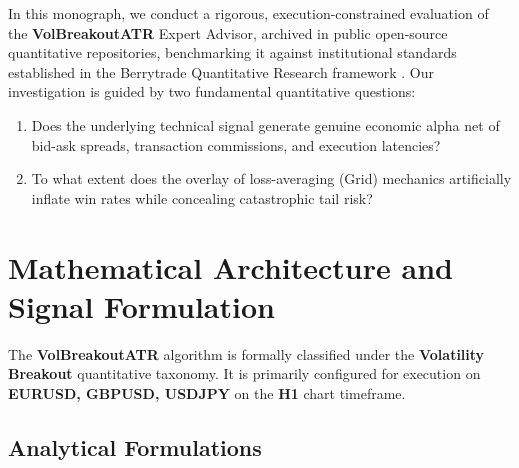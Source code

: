 \documentclass[11pt,a4paper]{article}
\begin{document}
In this monograph, we conduct a rigorous, execution-constrained evaluation of the \textbf{VolBreakoutATR} Expert Advisor, archived in public open-source quantitative repositories, benchmarking it against institutional standards established in the Berrytrade Quantitative Research framework \cite{artsu2026illusion}. Our investigation is guided by two fundamental quantitative questions:
\begin{enumerate}
    \item Does the underlying technical signal generate genuine economic alpha net of bid-ask spreads, transaction commissions, and execution latencies?
    \item To what extent does the overlay of loss-averaging (Grid) mechanics artificially inflate win rates while concealing catastrophic tail risk?
\end{enumerate}

\section{Mathematical Architecture and Signal Formulation}
The \textbf{VolBreakoutATR} algorithm is formally classified under the \textbf{Volatility Breakout} quantitative taxonomy. It is primarily configured for execution on \textbf{EURUSD, GBPUSD, USDJPY} on the \textbf{H1} chart timeframe.

\subsection{Analytical Formulations}
\end{document}
